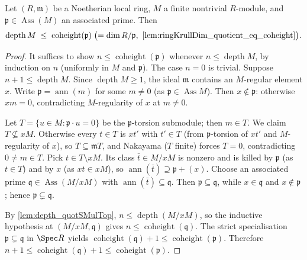 \begin{theorem}
  \label{thm:ischebeck}
  \leanok
  Let \((R, \mathfrak m)\) be a Noetherian local ring, \(M\) a finite nontrivial
  \(R\)-module, and \(\mathfrak p \in \operatorname{Ass}(M)\) an associated prime.
  Then
  \[
    \operatorname{depth} M \;\le\; \operatorname{coheight}(\mathfrak p)
    \;\bigl(= \dim R/\mathfrak p,\ \ref{lem:ringKrullDim_quotient_eq_coheight}\bigr).
  \]
\end{theorem}
\begin{proof}
  \leanok
  It suffices to show \(n \le \operatorname{coheight}(\mathfrak p)\) whenever
  \(n \le \operatorname{depth} M\), by induction on \(n\) (uniformly in \(M\) and
  \(\mathfrak p\)). The case \(n = 0\) is trivial. Suppose
  \(n + 1 \le \operatorname{depth} M\). Since \(\operatorname{depth} M \ge 1\),
  the ideal \(\mathfrak m\) contains an \(M\)-regular element \(x\). Write
  \(\mathfrak p = \operatorname{ann}(m)\) for some \(m \neq 0\) (as
  \(\mathfrak p \in \operatorname{Ass} M\)). Then \(x \notin \mathfrak p\):
  otherwise \(x m = 0\), contradicting \(M\)-regularity of \(x\) at \(m \neq 0\).

  Let \(T = \{u \in M : \mathfrak p \cdot u = 0\}\) be the \(\mathfrak p\)-torsion
  submodule; then \(m \in T\). We claim \(T \not\subseteq xM\). Otherwise every
  \(t \in T\) is \(x t'\) with \(t' \in T\) (from \(\mathfrak p\)-torsion of
  \(x t'\) and \(M\)-regularity of \(x\)), so \(T \subseteq \mathfrak m T\), and
  Nakayama (\(T\) finite) forces \(T = 0\), contradicting \(0 \ne m \in T\). Pick
  \(t \in T \setminus xM\). Its class \(\bar t \in M/xM\) is nonzero and is killed
  by \(\mathfrak p\) (as \(t \in T\)) and by \(x\) (as \(x t \in xM\)), so
  \(\operatorname{ann}(\bar t) \supseteq \mathfrak p + (x)\). Choose an associated
  prime \(\mathfrak q \in \operatorname{Ass}(M/xM)\) with
  \(\operatorname{ann}(\bar t) \subseteq \mathfrak q\). Then
  \(\mathfrak p \subseteq \mathfrak q\), while \(x \in \mathfrak q\) and
  \(x \notin \mathfrak p\); hence \(\mathfrak p \subsetneq \mathfrak q\).

  By \ref{lem:depth_quotSMulTop}, \(n \le \operatorname{depth}(M/xM)\), so the
  inductive hypothesis at \((M/xM, \mathfrak q)\) gives
  \(n \le \operatorname{coheight}(\mathfrak q)\). The strict specialisation
  \(\mathfrak p \subsetneq \mathfrak q\) in \(\Spec R\) yields
  \(\operatorname{coheight}(\mathfrak q) + 1 \le \operatorname{coheight}(\mathfrak p)\).
  Therefore
  \(n + 1 \le \operatorname{coheight}(\mathfrak q) + 1 \le \operatorname{coheight}(\mathfrak p)\).
\end{proof}

